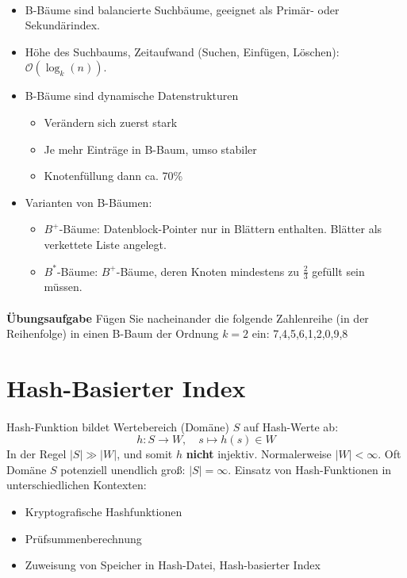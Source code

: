 \begin{frame}{\insertsection}
\framesubtitle{\insertsubsection}
\begin{itemize}
\item B-B\"aume sind balancierte Suchb\"aume, geeignet als Prim\"ar- oder Sekund\"arindex.
\item H\"ohe des Suchbaums, Zeitaufwand (Suchen, Einf\"ugen, L\"oschen): $\mathcal{O}\left(\log_{k}(n)\right)$.
\item B-Bäume sind dynamische Datenstrukturen
\begin{itemize}
	\item Ver\"andern sich zuerst stark
	\item Je mehr Einträge in B-Baum, umso stabiler
	\item Knotenfüllung dann ca. 70\%
\end{itemize}
\item Varianten von B-Bäumen:
\begin{itemize}
\item $B^+$-Bäume: Datenblock-Pointer nur in Blättern enthalten. Blätter als verkettete Liste angelegt.
\item $B^*$-Bäume: $B^+$-Bäume, deren Knoten mindestens zu $\frac{2}{3}$ gefüllt sein müssen.
\end{itemize}
\end{itemize}                                               
\end{frame}

\begin{frame}{\insertsection}
\framesubtitle{\insertsubsection}	
\begin{block}{\textbf{\"Ubungsaufgabe}}
Fügen Sie nacheinander die folgende Zahlenreihe (in der Reihenfolge) in einen B-Baum der Ordnung $k=2$ ein: 7,4,5,6,1,2,0,9,8
\end{block}
\end{frame}

\section{Hash-Basierter Index}

\begin{frame}{\insertsection}
\framesubtitle{\insertsubsection}	
\abs
Hash-Funktion bildet Wertebereich (Dom\"ane) $S$ auf Hash-Werte ab:
\begin{equation*}
h:S\to W,\quad s\mapsto h(s)\in W
\end{equation*}
In der Regel $\vert S\vert\gg \vert W\vert$, und somit $h$ \textbf{nicht} injektiv. 
\nl
Normalerweise $\vert W\vert<\infty$. Oft Dom\"ane $S$ potenziell unendlich {gro\ss}: $\vert S\vert=\infty$.
\abs
\pause
Einsatz von Hash-Funktionen in unterschiedlichen Kontexten: 
\begin{itemize}
	\item Kryptografische Hashfunktionen
	\item Prüfsummenberechnung
	\item Zuweisung von Speicher in Hash-Datei, Hash-basierter Index
\end{itemize}
\end{frame}

